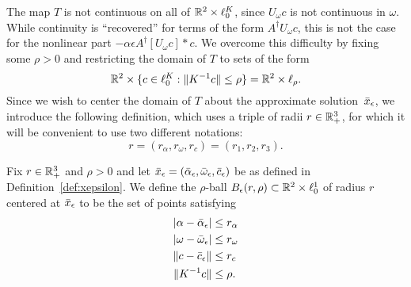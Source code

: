 The map $T$ is not continuous on all of $\mathbb{R}^2 \times \ell^K_0$,
since $ U_{\omega} c $ is not continuous in $\omega$.
While continuity is ``recovered'' for terms of the form $A^{\dagger} U_{\omega} c$,  this is not the case for the nonlinear part $ - \alpha \epsilon A^{\dagger} [ U_{\omega} c ] * c$.  
%
% 
We overcome this difficulty by fixing some $ \rho > 0$ and restricting the domain of $T$ to sets of the form 
\[
  \mathbb{R}^2 \times  \{ c \in \ell^K_0 : \|K^{-1} c\| \leq \rho \} = \mathbb{R}^2 \times \ell_\rho.
\]
Since we wish to center the domain of $T$ about the approximate solution~$\bar{x}_\epsilon$, we introduce the following definition, which uses a triple of radii $r \in \mathbb{R}^3_+$, for which it will be convenient to use two different notations:
\[
  r = ( r_{\alpha } , r_{\omega} , r_c) = (r_1,r_2,r_3).
\]
\begin{definition}
	Fix   $ r \in \mathbb{R}^3_+$ and $ \rho > 0$ and let  $ \bar{x}_\epsilon = ( \bar{\alpha}_\epsilon , \bar{\omega}_\epsilon , \bar{c}_\epsilon )$ be as defined in Definition~\ref{def:xepsilon}. 
    We define the $\rho$-ball $B_\epsilon(r,\rho) \subset \mathbb{R}^2 \times \ell^1_0$
    of radius $r$ centered at $\bar{x}_\epsilon$ to be the set of points satisfying 
\begin{alignat*}{1}
	|  \alpha -\bar{\alpha}_\epsilon | & \leq  r_\alpha  \\
	| \omega - \bar{\omega}_\epsilon  | & \leq  r_{\omega} \\
	\| c - \bar{c}_\epsilon  \| & \leq r_c \\
	\|K^{-1} c\| & \leq  \rho .
\end{alignat*}
\end{definition}

